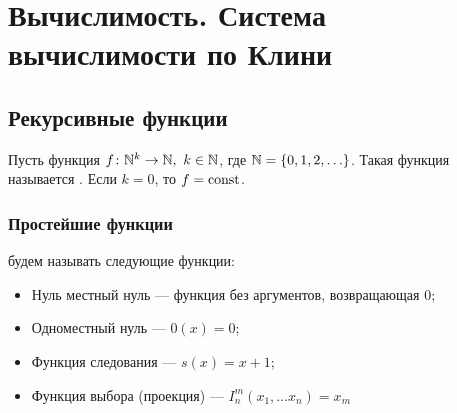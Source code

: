 \chapter{Вычислимость. Система вычислимости по Клини} 
\section{Рекурсивные функции}

\begin{defn}[]
	Пусть функция $ f\colon \mathbb{N}^{k} \to  \mathbb{N}, ~ k \in \mathbb{N}$, где $ \mathbb{N} = \{0, 1, 2, \ldots \}$. Такая функция называется . Если $ k = 0$, то $ f = \textmd{const}$.
\end{defn}

\subsection{Простейшие функции} 
 будем называть следующие функции:
\begin{itemize}
	\item Нуль местный нуль --- функция без аргументов, возвращающая $ 0$;
	\item Одноместный нуль --- $ 0(x) = 0$;
	\item Функция следования --- $ s(x) = x + 1$;
	\item Функция выбора (проекция) ---  $ I_{n}^{m}(x_1, \ldots x_{n}) = x_m$
\end{itemize}


